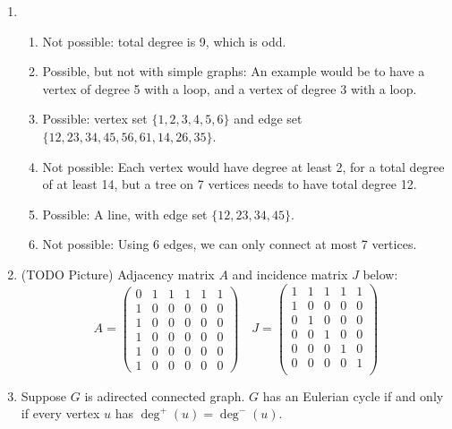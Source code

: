 \documentclass[a4paper,12pt]{article}
\begin{document}
\begin{enumerate}
\item
    \begin{enumerate}
    \item Not possible: total degree is 9, which is odd.
    \item Possible, but not with simple graphs: An example would be to have
    a vertex of degree 5 with a loop, and a vertex of degree 3 with a loop.
    \item Possible: vertex set $\{1, 2, 3, 4, 5, 6\}$ and edge set
    $\{12, 23, 34, 45, 56, 61, 14, 26, 35\}$.
    \item Not possible: Each vertex would have degree at least 2, for a total
    degree of at least 14, but a tree on 7 vertices needs to have total degree
    12.
    \item Possible: A line, with edge set $\{12, 23, 34, 45\}$.
    \item Not possible: Using 6 edges, we can only connect at most 7 vertices.
    \end{enumerate}
\item
    (TODO Picture)
    Adjacency matrix $A$ and incidence matrix $J$ below:
    \[
    A = \begin{pmatrix}
        0 & 1 & 1 & 1 & 1 & 1 \\
        1 & 0 & 0 & 0 & 0 & 0 \\
        1 & 0 & 0 & 0 & 0 & 0 \\
        1 & 0 & 0 & 0 & 0 & 0 \\
        1 & 0 & 0 & 0 & 0 & 0 \\
        1 & 0 & 0 & 0 & 0 & 0
    \end{pmatrix}
    \quad
    J = \begin{pmatrix}
        1 & 1 & 1 & 1 & 1 \\
        1 & 0 & 0 & 0 & 0 \\
        0 & 1 & 0 & 0 & 0 \\
        0 & 0 & 1 & 0 & 0 \\
        0 & 0 & 0 & 1 & 0 \\
        0 & 0 & 0 & 0 & 1 \\
    \end{pmatrix}
    \]
\item
    Suppose $G$ is adirected connected graph.
    $G$ has an Eulerian cycle if and only if every vertex $u$ has
    $\deg^+(u) = \deg^-(u)$.


\end{enumerate}
\end{document}
